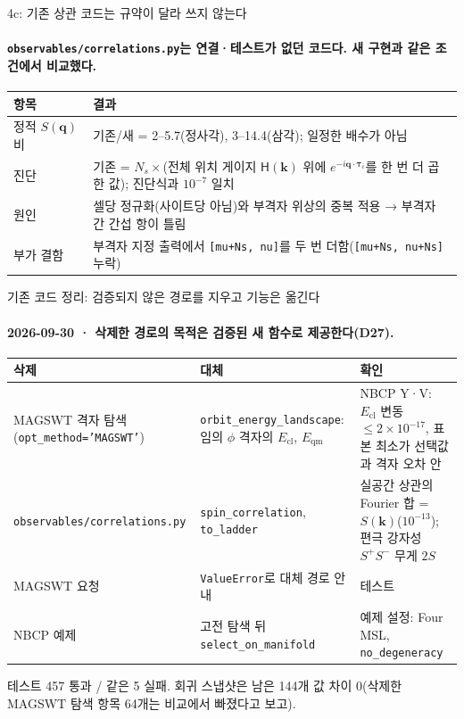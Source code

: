 \begin{frame}[label=stage4c-legacy]{4c: 기존 상관 코드는 규약이 달라 쓰지 않는다}
  \framesubtitle{\texttt{observables/correlations.py}는 연결·테스트가 없던 코드다. 새 구현과 같은 조건에서 비교했다.}
  \small
  \begin{tabularx}{\textwidth}{@{}P{3.2cm}Y@{}}
    \toprule
    항목 & 결과 \\
    \midrule
    정적 $S(\mathbf q)$ 비 & 기존/새 = 2--5.7(정사각), 3--14.4(삼각); 일정한 배수가 아님 \\
    진단 & 기존 = $N_s\times$(전체 위치 게이지 $\mathsf H(\mathbf k)$ 위에 $e^{-i\mathbf q\cdot\symbf{\tau}_i}$를 한 번 더 곱한 값); 진단식과 $10^{-7}$ 일치 \\
    원인 & 셀당 정규화(사이트당 아님)와 부격자 위상의 중복 적용 → 부격자 간 간섭 항이 틀림 \\
    부가 결함 & 부격자 지정 출력에서 \texttt{[mu+Ns, nu]}를 두 번 더함(\texttt{[mu+Ns, nu+Ns]} 누락) \\
    \bottomrule
  \end{tabularx}
  \par\medskip
\end{frame}

\begin{frame}[label=legacy-cleanup]{기존 코드 정리: 검증되지 않은 경로를 지우고 기능은 옮긴다}
  \framesubtitle{2026-09-30 · 삭제한 경로의 목적은 검증된 새 함수로 제공한다(D27).}
  \footnotesize\renewcommand{\arraystretch}{1.1}
  \begin{tabularx}{\textwidth}{@{}P{3.4cm}P{3.6cm}Y@{}}
    \toprule
    삭제 & 대체 & 확인 \\
    \midrule
    MAGSWT 격자 탐색(\texttt{opt\_method='MAGSWT'}) & \texttt{orbit\_energy\_landscape}: 임의 $\phi$ 격자의 $E_{\mathrm{cl}}$, $E_{\mathrm{qm}}$ & NBCP Y·V: $E_{\mathrm{cl}}$ 변동 $\le2\times10^{-17}$, 표본 최소가 선택값과 격자 오차 안 \\
    \texttt{observables/correlations.py} & \texttt{spin\_correlation}, \texttt{to\_ladder} & 실공간 상관의 Fourier 합 = $S(\mathbf k)$($10^{-13}$); 편극 강자성 $S^{+}S^{-}$ 무게 $2S$ \\
    MAGSWT 요청 & \texttt{ValueError}로 대체 경로 안내 & 테스트 \\
    NBCP 예제 & 고전 탐색 뒤 \texttt{select\_on\_manifold} & 예제 설정: Four MSL, \texttt{no\_degeneracy} \\
    \bottomrule
  \end{tabularx}
  \par\medskip
  테스트 457 통과 / 같은 5 실패. 회귀 스냅샷은 남은 144개 값 차이 0(삭제한 MAGSWT 탐색 항목 64개는 비교에서 빠졌다고 보고).
  \par\medskip
\end{frame}

